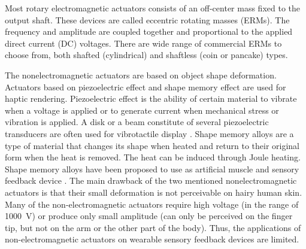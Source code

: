 Most rotary electromagnetic actuators consists of an off-center mass fixed to the output shaft.  These devices are called eccentric rotating masses (ERMs). The frequency and amplitude are coupled together and proportional to the applied direct current (DC) voltages. There are wide range of commercial ERMs to choose from, both shafted (cylindrical) and shaftless (coin or pancake) types.

The nonelectromagnetic actuators are based on object shape deformation. 
Actuators based on piezoelectric effect and shape memory effect are used for haptic rendering. Piezoelectric effect is the ability of certain material to vibrate when a voltage is applied or to generate current when mechanical stress or vibration is applied.  A disk or a beam constitute of several piezoelectric transducers are often used for vibrotactile display \cite{poupyrev2002ambient}. 
Shape memory alloys are a type of material that changes its shape when heated and return to their original form when the heat is removed. The heat can be induced through Joule heating. Shape memory alloys have been proposed to use as artificial muscle \cite{taniguchi2013flexible} and sensory feedback device \cite{sawada2016tactile}. The main drawback of the two mentioned nonelectromagnetic actuators is that their small deformation is not perceivable on hairy human skin. Many of the non-electromagnetic actuators require high voltage (in the range of \SI{1000}{V}) or produce only small amplitude (can only be perceived on the finger tip, but not on the arm or the other part of the body). Thus, the applications of non-electromagnetic actuators on wearable sensory feedback devices are limited.


